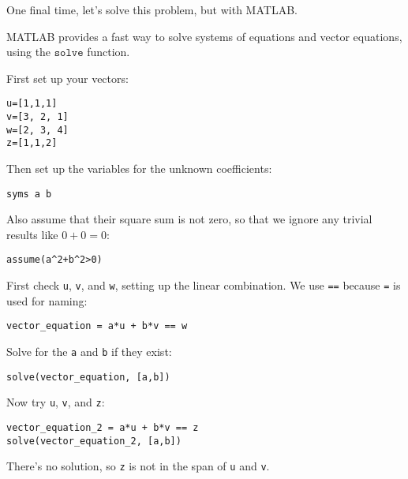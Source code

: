 \documentclass{ximera}
\begin{document}
\begin{exploration}
\begin{example}
  \begin{example}
  
    One final time, let's solve this problem, but with MATLAB. 

    MATLAB provides a fast way to solve systems of equations and vector equations, using the $\texttt{solve}$ function.

    First set up your vectors:
\begin{verbatim}
u=[1,1,1]
v=[3, 2, 1]
w=[2, 3, 4]
z=[1,1,2]
\end{verbatim}

Then set up the variables for the unknown coefficients:
\begin{verbatim}
syms a b
\end{verbatim}

Also assume that their square sum is not zero, so that we ignore any trivial results like \(0 + 0 = 0\):
\begin{verbatim}
assume(a^2+b^2>0)
\end{verbatim}

First check \verb|u|, \verb|v|, and \verb|w|, setting up the linear combination. We use \verb|==| because \verb|=| is used for naming:
\begin{verbatim}
vector_equation = a*u + b*v == w
\end{verbatim}

Solve for the \verb|a| and \verb|b| if they exist:
\begin{verbatim}
solve(vector_equation, [a,b])
\end{verbatim}

Now try \verb|u|, \verb|v|, and \verb|z|:
\begin{verbatim}
vector_equation_2 = a*u + b*v == z
solve(vector_equation_2, [a,b])
\end{verbatim}

There's no solution, so \verb|z| is not in the span of \verb|u| and \verb|v|.


  \end{example}
  
\end{example}

\end{exploration}
\end{document}
